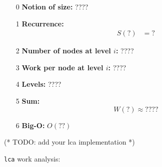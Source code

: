 \documentclass[11pt]{article}
\newcommand{\code}[2][]{{\sloppy
\ifmmode
    \text{\lstinline[language=sml,style=15150code,#1]`#2`}
\else
    {\lstinline[language=sml,style=15150code,#1]`#2`}%
\fi}}
\newcommand{\Step}[1]{\colorbox{emph_color}{\color{white}\textsf{#1}}}
\begin{document}
\begin{enumerate}
    \item[\Step 0]
        \textbf{Notion of size: }%
    ???? %

    \item[\Step 1]\textbf{Recurrence:}
    \begin{align*}
        S(?) &= ? %
    \end{align*}

    \item[\Step 2] \textbf{Number of nodes at level $i$: }
    ???? %

    \item[\Step 3] \textbf{Work per node at level $i$: }
    ???? %

    \item[\Step 4] \textbf{Levels: }%
    ???? %

    \item[\Step 5]\textbf{Sum:}
    \[ W(?) \approx ???? \] %

    \item[\Step 6]\textbf{Big-O: }%
    $O(??)$ %

\end{enumerate}


\newpage
\begin{codeblock}
  (* TODO: add your lca implementation *)
\end{codeblock}
\code{lca} work analysis:
\end{document}
